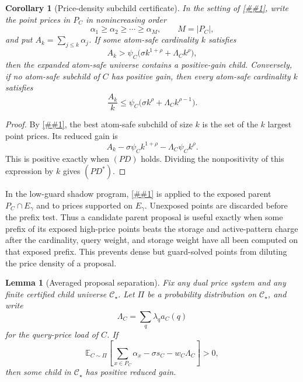 \documentclass[10pt]{article}
\newcommand{\cref}[1]{\ref{##1}}
\newtheorem{lemma}[theorem]{Lemma}
\newtheorem{corollary}[theorem]{Corollary}
\theoremstyle{definition}
\newcommand{\E}{\mathbb{E}}
\begin{document}
\begin{corollary}[Price-density subchild certificate]
   \label{cor:price-density-subchild}
   In the setting of \cref{lem:atom-safe-subchild}, write the point prices in
   $P_C$ in nonincreasing order
   \[
      \alpha_1\ge\alpha_2\ge\cdots\ge\alpha_M,
      \qquad M=|P_C|,
   \]
   and put $A_k=\sum_{j\le k}\alpha_j$.  If some atom-safe cardinality $k$
   satisfies
   \[
      A_k>
      \psi_C\bigl(\sigma k^{1+\rho}+\Lambda_C k^\rho\bigr),
      \tag{PD}
   \]
   then the expanded atom-safe universe contains a positive-gain child.
   Conversely, if no atom-safe subchild of $C$ has positive gain, then every
   atom-safe cardinality $k$ satisfies
   \[
      \frac{A_k}{k}
      \le
      \psi_C\bigl(\sigma k^\rho+\Lambda_C k^{\rho-1}\bigr).
      \tag{PD$^\ast$}
   \]
\end{corollary}

\begin{proof}
   By \cref{lem:atom-safe-subchild}, the best atom-safe subchild of size $k$ is
   the set of the $k$ largest point prices.  Its reduced gain is
   \[
      A_k-\sigma\psi_C k^{1+\rho}-\Lambda_C\psi_C k^\rho .
   \]
   This is positive exactly when \((PD)\) holds.  Dividing the nonpositivity of
   this expression by $k$ gives \((PD^\ast)\).
\end{proof}

In the low-guard shadow program, \cref{cor:price-density-subchild} is applied to
the exposed parent $P_C\cap E_\gamma$ and to prices supported on
$E_\gamma$.  Unexposed points are discarded before the prefix test.  Thus a
candidate parent proposal is useful exactly when some prefix of its exposed
high-price points beats the storage and active-pattern charge after the
cardinality, query weight, and storage weight have all been computed on that
exposed prefix.  This prevents dense but guard-solved points from diluting the
price density of a proposal.

\begin{lemma}[Averaged proposal separation]\label{lem:averaged-proposal-separation}
   Fix any dual price system and any finite certified child universe
   $\mathcal C_\star$.  Let $\Pi$ be a probability distribution on
   $\mathcal C_\star$, and write
   \[
      \Lambda_C=\sum_q\lambda_qa_C(q)
   \]
   for the query-price load of $C$.  If
   \[
      \E_{C\sim\Pi}\left[
         \sum_{x\in P_C}\alpha_x
         -\sigma s_C
         -w_C\Lambda_C
      \right]>0,
   \]
   then some child in $\mathcal C_\star$ has positive reduced gain.
\end{lemma}
\end{document}
